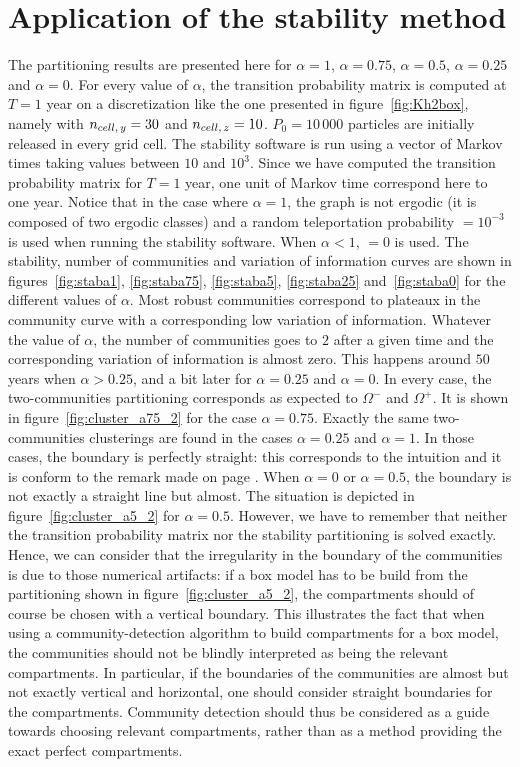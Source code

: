 \section{Application of the stability method} \label{sec:applicationstability}
The partitioning results are presented here for $\alpha = 1$, $\alpha = 0.75$, $\alpha = 0.5$, $\alpha = 0.25$ and $\alpha = 0$. For every value of $\alpha$, the transition probability matrix is computed at $T = 1$ year on a discretization like the one presented in figure~\ref{fig:Kh2box}, namely with $n_{cell,\,y} = 30$ and $n_{cell,\,z} = 10$. $P_0 = 10\,000$ particles are initially released in every grid cell. The stability software is run using a vector of Markov times taking values between $10$ and $10^3$. Since we have computed the transition probability matrix for $T = 1$ year, one unit of Markov time correspond here to one year. Notice that in the case where $\alpha = 1$, the graph is not ergodic (it is composed of two ergodic classes) and a random teleportation probability  $= 10^{-3}$ is used when running the stability software. When $\alpha < 1$,  $=0$ is used.
The stability, number of communities and variation of information curves are shown in figures~\ref{fig:staba1}, \ref{fig:staba75}, \ref{fig:staba5}, \ref{fig:staba25} and~\ref{fig:staba0} for the different values of $\alpha$. Most robust communities correspond to plateaux in the community curve with a corresponding low variation of information. Whatever the value of $\alpha$, the number of communities goes to $2$ after a given time and the corresponding variation of information is almost zero. This happens around $50$ years when $\alpha > 0.25$, and a bit later for $\alpha = 0.25$ and $\alpha = 0$. In every case, the two-communities partitioning corresponds as expected to $\Omega^-$ and $\Omega^+$. It is shown in figure~\ref{fig:cluster_a75_2} for the case $\alpha = 0.75$. Exactly the same two-communities clusterings are found in the cases $\alpha = 0.25$ and $\alpha = 1$. In those cases, the boundary is perfectly straight: this corresponds to the intuition and it is conform to the remark made on page \pageref{remark:straightboundaries}. When $\alpha = 0$ or $\alpha = 0.5$, the boundary is not exactly a straight line but almost. The situation is depicted in figure~\ref{fig:cluster_a5_2} for $\alpha = 0.5$. However, we have to remember that neither the transition probability matrix nor the stability partitioning is solved exactly. Hence, we can consider that the irregularity in the boundary of the communities is due to those numerical artifacts: if a box model has to be build from the partitioning shown in figure~\ref{fig:cluster_a5_2}, the compartments should of course be chosen with a vertical boundary. This illustrates the fact that when using a community-detection algorithm to build compartments for a box model, the communities should not be blindly interpreted as being the relevant compartments. In particular, if the boundaries of the communities are almost but not exactly vertical and horizontal, one should consider straight boundaries for the compartments. Community detection should thus be considered as a guide towards choosing relevant compartments, rather than as a method providing the exact perfect compartments.

